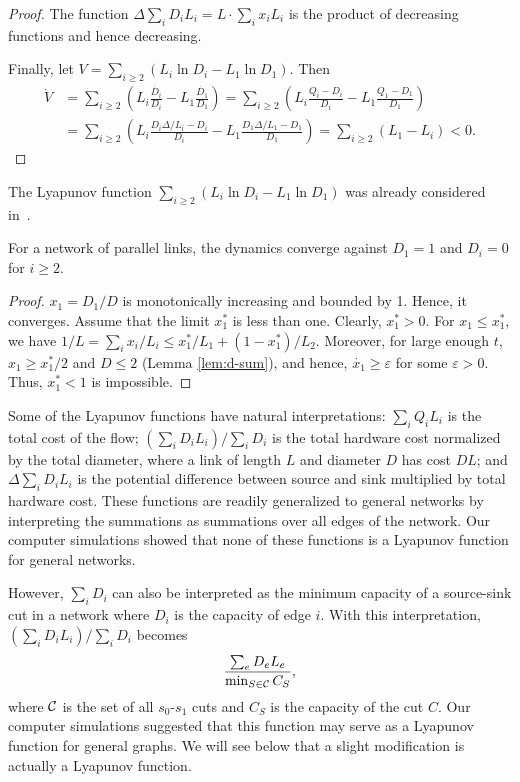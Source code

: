 \documentclass[11pt,a4paper]{article}
\renewcommand{\source}{\ensuremath{s_0}}
\renewcommand{\sink}{\ensuremath{s_1}}
\begin{document}
\begin{proof}
The function $\Delta \sum_i D_i L_i = L \cdot \sum_i x_i L_i$ is the product of decreasing
functions and hence decreasing. \smallskip

Finally, let $V = \sum_{i \ge 2} (L_i \ln D_i - L_1 \ln D_1)$. Then
\begin{align*}
\dot{V} & = \sum_{i \ge 2} \left(L_i\frac{\dot{D_i}}{D_i} - L_1\frac{\dot{D_1}}{D_1}\right)
= \sum_{i \ge 2} \left(L_i\frac{Q_i - D_i}{D_i} - L_1\frac{Q_1 -
D_1}{D_1}\right) \\
& = 
\sum_{i \ge 2} \left(L_i\frac{D_i\Delta/L_i - D_i}{D_i} - L_1\frac{D_1\Delta/L_1 -
D_1}{D_1}\right) = \sum_{i \ge 2} (L_1 - L_i) < 0.\end{align*}
\Lnegskip\end{proof}

The Lyapunov function $\sum_{i \ge 2} (L_i \ln D_i - L_1 \ln D_1)$ was already
considered in~\cite{Miyaji-Ohnish07}. 

\begin{theorem} For a network of
parallel links, the dynamics converge against $D_1 = 1$ and $D_i = 0$ for $i
\ge 2$. \end{theorem}
\begin{proof} $x_1 = D_1/D$ is monotonically increasing and bounded by 1. Hence,
it converges. Assume that the limit $x_1^*$ is less than one. Clearly, $x_1^* > 0$. For
$x_1 \le x_1^*$, we have $1/L = \sum_i x_i/L_i \le x^*_1/L_1 + (1 -
x^*_1)/L_2$. Moreover, for large enough $t$, $x_1 \ge x_1^*/2$ and $D \le 2$
(Lemma \ref{lem:d-sum}),
and hence, $\dot{x_1} \ge \varepsilon$ for some $\varepsilon > 0$. Thus, $x_1^*
< 1$ is impossible. \end{proof}

Some of the Lyapunov functions have natural interpretations: $\sum_i Q_i
L_i$ is the total cost of the flow; $(\sum_i D_iL_i)/\sum_i D_i$ is the total
hardware cost normalized by the total diameter, where
a link of length $L$ and diameter $D$ has cost $DL$; and
$\Delta \sum_i D_iL_i$ is the potential difference between
source and sink multiplied by total hardware cost. These functions are readily
generalized to general networks by interpreting the summations as summations
over all edges of the network. Our computer simulations showed that none of
these functions is a Lyapunov function for general networks. 

However, $\sum_i D_i$ can also be interpreted as the minimum capacity of a
source-sink cut in a network where $D_i$ is the capacity of edge $i$. With this
interpretation, $(\sum_i D_iL_i)/\sum_i D_i$ becomes
\[              \frac{\sum_e D_e L_e}{\min_{S \in \cal C} C_S} ,\]
where $\cal C$ is the set of all $\source$-$\sink$ cuts and $C_S$ is the
capacity of the cut $C$. Our computer simulations suggested that this function
may serve as a Lyapunov function for general graphs. We will see below that a
slight modification is actually a Lyapunov function. 
\end{document}
